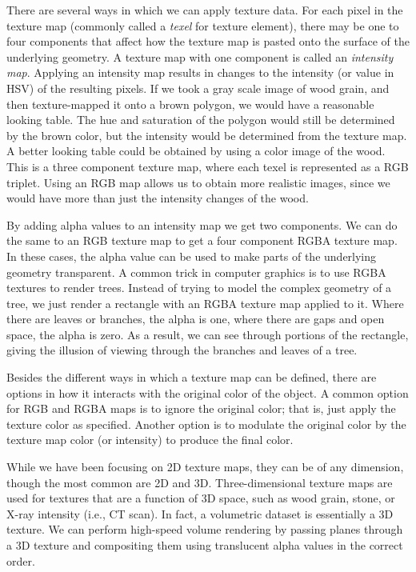 There are several ways in which we can apply texture data. For each pixel in the texture map (commonly called a \emph{texel} for texture element), there may be one to four components that affect how the texture map is pasted onto the surface of the underlying geometry. A texture map with one component is called an \emph{intensity map}. Applying an intensity map results in changes to the intensity (or value in HSV) of the resulting pixels. If we took a gray scale image of wood grain, and then texture-mapped it onto a brown polygon, we would have a reasonable looking table. The hue and saturation of the polygon would still be determined by the brown color, but the intensity would be determined from the texture map. A better looking table could be obtained by using a color image of the wood. This is a three component texture map, where each texel is represented as a RGB triplet. Using an RGB map allows us to obtain more realistic images, since we would have more than just the intensity changes of the wood.

By adding alpha values to an intensity map we get two components. We can do the same to an RGB texture map to get a four component RGBA texture map. In these cases, the alpha value can be used to make parts of the underlying geometry transparent. A common trick in computer graphics is to use RGBA textures to render trees. Instead of trying to model the complex geometry of a tree, we just render a rectangle with an RGBA texture map applied to it. Where there are leaves or branches, the alpha is one, where there are gaps and open space, the alpha is zero. As a result, we can see through portions of the rectangle, giving the illusion of viewing through the branches and leaves of a tree.

Besides the different ways in which a texture map can be defined, there are options in how it interacts with the original color of the object. A common option for RGB and RGBA maps is to ignore the original color; that is, just apply the texture color as specified. Another option is to modulate the original color by the texture map color (or intensity) to produce the final color.

While we have been focusing on 2D texture maps, they can be of any dimension, though the most common are 2D and 3D. Three-dimensional texture maps are used for textures that are a function of 3D space, such as wood grain, stone, or X-ray intensity (i.e., CT scan). In fact, a volumetric dataset is essentially a 3D texture. We can perform high-speed volume rendering by passing planes through a 3D texture and compositing them using translucent alpha values in the correct order.

